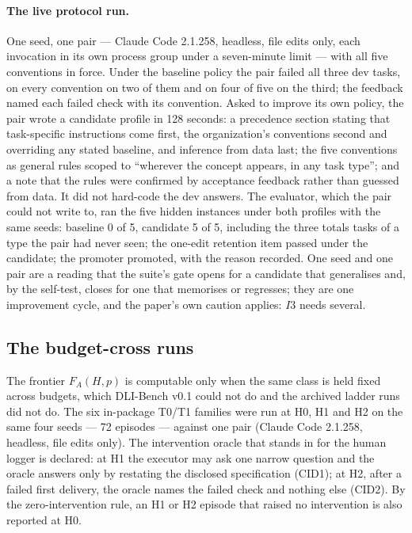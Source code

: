 \paragraph{The live protocol run.} One seed, one pair --- Claude Code 2.1.258, headless, file edits only, each invocation in its own process group under a seven-minute limit --- with all five conventions in force. Under the baseline policy the pair failed all three dev tasks, on every convention on two of them and on four of five on the third; the feedback named each failed check with its convention. Asked to improve its own policy, the pair wrote a candidate profile in 128 seconds: a precedence section stating that task-specific instructions come first, the organization's conventions second and overriding any stated baseline, and inference from data last; the five conventions as general rules scoped to ``wherever the concept appears, in any task type''; and a note that the rules were confirmed by acceptance feedback rather than guessed from data. It did not hard-code the dev answers. The evaluator, which the pair could not write to, ran the five hidden instances under both profiles with the same seeds: baseline 0 of 5, candidate 5 of 5, including the three totals tasks of a type the pair had never seen; the one-edit retention item passed under the candidate; the promoter promoted, with the reason recorded. One seed and one pair are a reading that the suite's gate opens for a candidate that generalises and, by the self-test, closes for one that memorises or regresses; they are one improvement cycle, and the paper's own caution applies: $I3$ needs several.

\subsection{The budget-cross runs}\label{sec:budgetcross}

The frontier $F_A(H,p)$ is computable only when the same class is held fixed across budgets, which DLI-Bench v0.1 could not do and the archived ladder runs did not do. The six in-package T0/T1 families were run at H0, H1 and H2 on the same four seeds --- 72 episodes --- against one pair (Claude Code 2.1.258, headless, file edits only). The intervention oracle that stands in for the human logger is declared: at H1 the executor may ask one narrow question and the oracle answers only by restating the disclosed specification (CID1); at H2, after a failed first delivery, the oracle names the failed check and nothing else (CID2). By the zero-intervention rule, an H1 or H2 episode that raised no intervention is also reported at H0.

